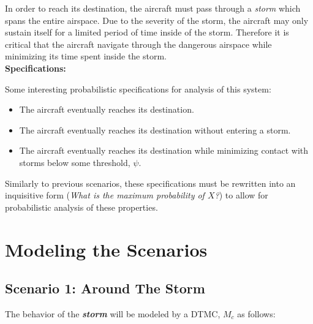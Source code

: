 \documentclass{article}
\begin{document}
In order to reach its destination, the aircraft must pass through a \textit{storm} which spans the entire airspace. Due to the severity of the storm, the aircraft may only sustain itself for a limited period of time inside of the storm. Therefore it is critical that the aircraft navigate through the dangerous airspace while minimizing its time spent inside the storm.
\\

\textbf{Specifications:}

Some interesting probabilistic specifications for analysis of this system:
\begin{itemize}
 \item The aircraft eventually reaches its destination.

 \item The aircraft eventually reaches its destination without entering a storm.

 \item The aircraft eventually reaches its destination while minimizing contact with storms below some threshold, $\psi$.
\end{itemize}

Similarly to previous scenarios, these specifications must be rewritten into an inquisitive form (\textit{What is the maximum probability of $X$?}) to allow for probabilistic analysis of these properties.


\section{Modeling the Scenarios}
\subsection*{Scenario 1: Around The Storm}

The behavior of the \textbf{\textit{storm}} will be modeled by a DTMC, $M_c$ as follows:

\begin{center}
\end{center}
\end{document}
